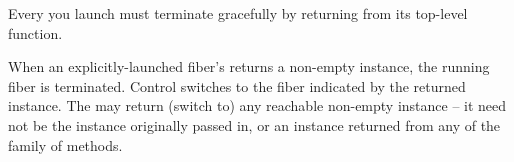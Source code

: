 \label{termination}

Every \fiber you launch must
terminate gracefully by returning from its top-level function.

When an explicitly-launched fiber's \entryfn returns a non-empty \fiber
instance, the running fiber is terminated. Control switches to the fiber
indicated by the returned \fiber instance. The \entryfn may return (switch to)
any reachable non-empty \fiber instance -- it need not be the instance originally
passed in, or an instance returned from any of the \resume family of
methods.

